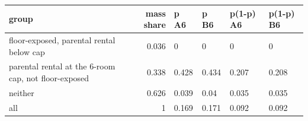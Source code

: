 \begingroup\small
\setlength{\tabcolsep}{3pt}
\renewcommand{\arraystretch}{1.04}
\begin{tabularx}{\linewidth}{XrXXXX}
\toprule
group & mass share & p A6 & p B6 & p(1-p) A6 & p(1-p) B6 \\
\midrule
floor-exposed, parental rental below cap & 0.036 & 0 & 0 & 0 & 0 \\
parental rental at the 6-room cap, not floor-exposed & 0.338 & 0.428 & 0.434 & 0.207 & 0.208 \\
neither & 0.626 & 0.039 & 0.04 & 0.035 & 0.035 \\
all & 1 & 0.169 & 0.171 & 0.092 & 0.092 \\
\bottomrule
\end{tabularx}
\endgroup

